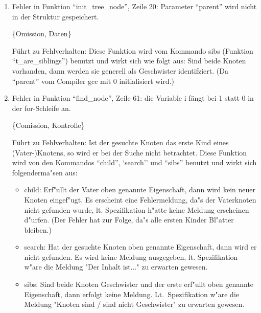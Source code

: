 
\begin{enumerate}

\item Fehler in Funktion ``init\_tree\_node'', Zeile 20: 
Parameter "`parent"' wird nicht in der Struktur gespeichert.

\{Omission, Daten\}

F\"uhrt zu Fehlverhalten: Diese Funktion wird vom Kommando sibs (Funktion
"`t\_are\_siblings"') benutzt und wirkt sich wie folgt aus: Sind beide Knoten
vorhanden, dann werden sie generell als Geschwister identifziert. (Da "`parent"'
vom Compiler gcc mit 0 initialisiert wird.)


\item Fehler in Funktion ``find\_node'', Zeile 61:
die Variable i f\"angt bei 1 statt 0 in der for-Schleife an.

\{Comission, Kontrolle\}

F\"uhrt zu Fehlverhalten: Ist der gesuchte Knoten das 
erste Kind eines (Vater-)Knotens, so wird er bei der
Suche nicht betrachtet. Diese Funktion wird von den Kommandos ``child'', 
`search'' und ``sibs'' benutzt und wirkt sich folgenderma"sen aus:
\begin{itemize}
	\item child: Erf"ullt der Vater oben genannte Eigenschaft,
		dann wird kein neuer Knoten eingef"ugt. Es erscheint eine Fehlermeldung,
		da"s der Vaterknoten nicht gefunden wurde, lt. Spezifikation h"atte
		keine Meldung erscheinen d"urfen. (Der Fehler hat zur Folge, 
		da"s alle ersten Kinder Bl"atter bleiben.)
	\item search: Hat der gesuchte Knoten oben genannte Eigenschaft, dann wird
		er nicht gefunden. Es wird keine Meldung ausgegeben, lt. Spezifikation 
		w"are die Meldung "Der Inhalt ist..." zu erwarten
		gewesen.
	\item sibs: Sind beide Knoten Geschwister und der erste 
		erf"ullt oben genannte Eigenschaft, dann erfolgt keine
		Meldung. Lt.~Spezifikation w"are die Meldung "Knoten sind / sind nicht
		Geschwister" zu erwarten gewesen.
\end{itemize}

%
%
%
%


\end{enumerate}
